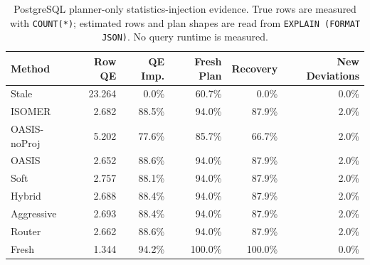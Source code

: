 \begin{table}[t]
  \centering
  \small
  \caption{PostgreSQL planner-only statistics-injection evidence. True rows are measured with \texttt{COUNT(*)}; estimated rows and plan shapes are read from \texttt{EXPLAIN (FORMAT JSON)}. No query runtime is measured.}
  \label{tab:postgres_planner_stats_injection}
  \setlength{\tabcolsep}{4pt}
  \begin{tabular}{lrrrrr}
    \toprule
    Method & Row QE & QE Imp. & Fresh Plan & Recovery & New Deviations \\
    \midrule
    Stale & 23.264 & 0.0\% & 60.7\% & 0.0\% & 0.0\% \\
    ISOMER & 2.682 & 88.5\% & 94.0\% & 87.9\% & 2.0\% \\
    OASIS-noProj & 5.202 & 77.6\% & 85.7\% & 66.7\% & 2.0\% \\
    OASIS & 2.652 & 88.6\% & 94.0\% & 87.9\% & 2.0\% \\
    Soft & 2.757 & 88.1\% & 94.0\% & 87.9\% & 2.0\% \\
    Hybrid & 2.688 & 88.4\% & 94.0\% & 87.9\% & 2.0\% \\
    Aggressive & 2.693 & 88.4\% & 94.0\% & 87.9\% & 2.0\% \\
    Router & 2.662 & 88.6\% & 94.0\% & 87.9\% & 2.0\% \\
    Fresh & 1.344 & 94.2\% & 100.0\% & 100.0\% & 0.0\% \\
    \bottomrule
  \end{tabular}
\end{table}
